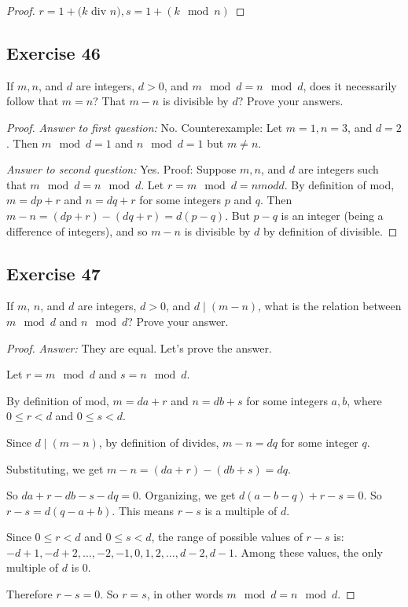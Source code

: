 \documentclass[14pt]{extarticle}
\begin{document}
\begin{proof}
$r = 1 + (k$ div $n), s = 1 + (k \mod n)$
\end{proof}

\subsection{Exercise 46}
If $m, n$, and $d$ are integers, $d > 0$, and $m \mod d = n \mod d$, does it necessarily follow that $m = n$? That $m - n$ is divisible by $d$? Prove your answers.

\begin{proof}
{\it Answer to first question:} No. Counterexample: Let $m = 1, n = 3$, and $d = 2$. Then $m \mod d = 1$ and $n \mod d = 1$ but $m \neq n$.

{\it Answer to second question:} Yes. Proof: Suppose $m, n$, and $d$ are integers such that $m \mod d = n \mod d$. Let $r = m \mod d = n mod d$. By definition of mod, $m = dp + r$ and $n = dq + r$ for some integers $p$ and $q$. Then $m - n = (dp + r) - (dq + r) = d(p - q)$. But $p - q$ is an integer (being a difference of integers), and so $m - n$ is divisible by $d$ by definition of divisible.
\end{proof}

\subsection{Exercise 47}
If $m$, $n$, and $d$ are integers, $d > 0$, and $d \mid (m - n)$, what is the relation between \\ $m \mod d$ and $n \mod d$? Prove your answer.

\begin{proof}
{\it Answer:} They are equal. Let's prove the answer.

Let $r = m \mod d$ and $s = n \mod d$.

By definition of mod, $m = da+r$ and $n = db+s$ for some integers $a,b$, where $0 \leq r < d$ and $0 \leq s < d$.

Since $d \mid (m - n)$, by definition of divides, $m-n = dq$ for some integer $q$. 

Substituting, we get $m-n = (da+r) - (db+s) = dq$.

So $da+r-db-s-dq = 0$. Organizing, we get $d(a-b-q) + r-s = 0$. So $r-s = d(q-a+b)$. This means $r-s$ is a multiple of $d$.

Since $0 \leq r < d$ and $0 \leq s < d$, the range of possible values of $r-s$ is: $-d+1, -d+2, \ldots, -2, -1, 0, 1, 2, \ldots, d-2, d-1$. Among these values, the only multiple of $d$ is 0. 

Therefore $r-s = 0$. So $r = s$, in other words $m \mod d = n \mod d$.
\end{proof}
\end{document}
